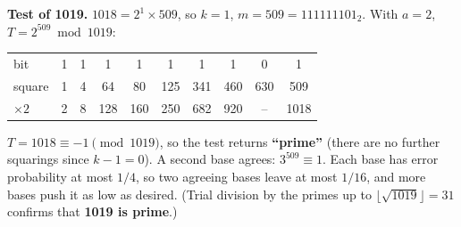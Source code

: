 \textbf{Test of 1019.} $1018 = 2^1 \times 509$, so $k = 1$, $m = 509 = 111111101_2$. With $a = 2$, $T = 2^{509} \bmod 1019$:
\begin{center}\small\setlength{\tabcolsep}{4pt}
\begin{tabular}{@{}l*{9}{c}@{}}
\toprule
bit & 1&1&1&1&1&1&1&0&1\\
square & 1&4&64&80&125&341&460&630&509\\
$\times 2$ & 2&8&128&160&250&682&920&--&1018\\
\bottomrule
\end{tabular}
\end{center}
$T = 1018 \equiv -1 \pmod{1019}$, so the test returns \textbf{``prime''} (there are no further squarings since $k - 1 = 0$). A second base agrees: $3^{509} \equiv 1$. Each base has error probability at most $1/4$, so two agreeing bases leave at most $1/16$, and more bases push it as low as desired. (Trial division by the primes up to $\lfloor\sqrt{1019}\rfloor = 31$ confirms that \textbf{1019 is prime}.)


